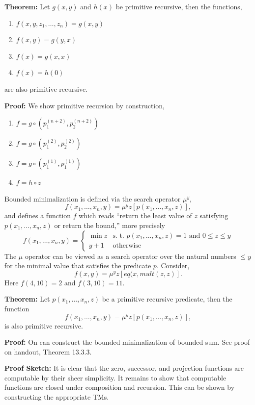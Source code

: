 \documentclass[a4paper,blends,pdf,colorBG,slideColor]{prosper}
\begin{document}
\small
{\bf Theorem:} Let $g(x,y)$ and $h(x)$ be primitive recursive, then the functions,
\begin{enumerate}
\item $f(x,y,z_1,\dots,z_n) = g(x,y)$
\item $f(x,y) = g(y,x)$
\item $f(x) = g(x,x)$
\item $f(x) = h(0)$
\end{enumerate}
are also primitive recursive.

{\bf Proof:}  We show primitive recursion by construction,
\begin{enumerate}
\item $f = g \circ (p^{(n+2)}_1, p^{(n+2)}_2)$
\item $f = g \circ (p^{(2)}_1, p^{(2)}_2)$
\item $f = g \circ (p^{(1)}_1, p^{(1)}_1)$
\item $f = h \circ z$
\end{enumerate}
\es


\small
Bounded minimalization is defined via the search operator $\mu^y$,
\[
f(x_1,\ldots,x_n,y) = \mu^y z[p(x_1,\ldots,x_n,z)],
\]
and defines a function $f$ which reads ``return the least value of $z$ satisfying $p(x_1,\ldots,x_n,z)$
or return the bound,'' more precisely 
\[
f(x_1,\ldots,x_n,y) = \left \{
	\begin{array}{ll}
	\min z &\text{s. t. $p(x_1,\ldots,x_n,z) = 1$ and $0 \le z \le y$}\\
	y + 1 &\text{otherwise}
	\end{array}
	\right .
\]
The $\mu$ operator can be viewed as a search operator over the natural numbers $\le y$
for the minimal value that satisfies the predicate $p$.  
Consider,
\[
f(x,y) = \mu^y z[eq(x, mult(z,z)].
\]
Here $f(4,10) = 2$ and $f(3,10)= 11$.

{\bf Theorem:} Let $p(x_1,\ldots,x_n,z)$ be a primitive recursive predicate, then the function
\[
f(x_1,\ldots,x_n,y) = \mu^y z[p(x_1,\ldots,x_n,z)],
\]
is also primitive recursive.

{\bf Proof:} On can construct the bounded minimalization of bounded sum.  See proof on handout,
Theorem 13.3.3.
\es





{\bf Proof Sketch:} It is clear that the zero, successor, and projection functions are
computable by their sheer simplicity.  It remains to show that computable functions
are closed under composition and recursion. This can be shown by constructing 
the appropriate TMs.
\end{document}
